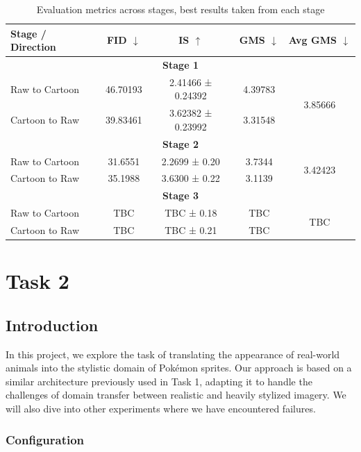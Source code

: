 \documentclass[twoside,english,notitlepage]{report}
\begin{document}
\begin{table}[h]
    \centering
    \begin{tabular}{|l|c|c|c|c|}
    \hline
    \textbf{Stage / Direction} & \textbf{FID} $\downarrow$ & \textbf{IS} $\uparrow$ & \textbf{GMS} $\downarrow$ & \textbf{Avg GMS} $\downarrow$ \\
    \hline
    \multicolumn{5}{|c|}{\textbf{Stage 1}} \\
    \hline
    Raw to Cartoon     & 46.70193     & 2.41466 ± 0.24392   & 4.39783    & \multirow{2}{*}{3.85666} \\
    Cartoon to Raw     & 39.83461         & 3.62382 ± 0.23992        & 3.31548        &            \\
    \hline
    \multicolumn{5}{|c|}{\textbf{Stage 2}} \\
    \hline
    Raw to Cartoon     & 31.6551     & 2.2699 ± 0.20   & 3.7344    & \multirow{2}{*}{3.42423} \\
    Cartoon to Raw     & 35.1988     & 3.6300 ± 0.22   & 3.1139    &            \\
    \hline
    \multicolumn{5}{|c|}{\textbf{Stage 3}} \\
    \hline
    Raw to Cartoon     & TBC     & TBC ± 0.18   & TBC    & \multirow{2}{*}{TBC} \\
    Cartoon to Raw     & TBC     & TBC ± 0.21   & TBC    &            \\
    \hline
    \end{tabular}
    \caption{Evaluation metrics across stages, best results taken from each stage}
    \label{tab:staged-eval}
\end{table}



\chapter{Task 2}
\section{Introduction}
In this project, we explore the task of translating the appearance of real-world animals into the stylistic domain of Pokémon sprites. Our approach is based on a similar architecture previously used in Task 1, adapting it to handle the challenges of domain transfer between realistic and heavily stylized imagery. We will also dive into other experiments where we have encountered failures.


\subsection{Configuration}\label{task2:configuration}
\end{document}
